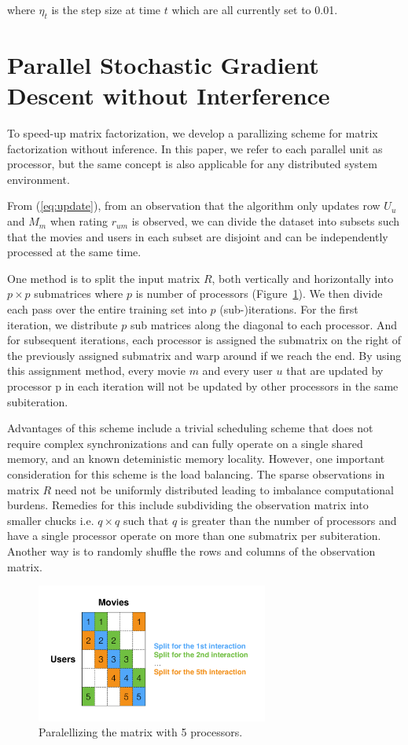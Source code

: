 \documentclass{article} %
\newcommand{\U}{U}
\begin{document}
where $\eta_t$ is the step size at time $t$ which are all currently set to 0.01.

\section{Parallel Stochastic Gradient Descent without Interference}

To speed-up matrix factorization, we develop a parallizing scheme for matrix factorization without inference.
In this paper, we refer to each parallel unit as processor, but the same concept is also applicable for any distributed system environment.

From (\ref{eq:update}), from an observation that the algorithm only updates row $\U_u$ and $M_m$ when rating $r_{um}$ is observed, we can divide the dataset into subsets such that the movies and users in each subset are disjoint and can be independently processed at the same time.

One method is to split the input matrix $R$, both vertically and horizontally
into $p \times p$ submatrices where $p$ is number of processors
(Figure~\ref{fig:split}). We then divide each pass over the entire training
set into $p$ (sub-)iterations. For the first iteration, we distribute $p$ sub
matrices along the diagonal to each processor.  And for subsequent iterations, each processor is assigned the submatrix on the right of the
previously assigned submatrix and warp around if we reach the end. By
using this assignment method, every movie $m$ and every user $u$ that are
updated by processor p in each iteration will not be updated by other
processors in the same subiteration.

Advantages of this scheme include a trivial scheduling scheme that does not require complex synchronizations and can fully operate on a single shared memory, and an known deteministic memory locality. However, one important consideration for this scheme is the load balancing. The sparse observations in matrix $R$ need not be uniformly distributed leading to imbalance computational burdens. Remedies for this include subdividing the observation matrix into smaller chucks i.e. $q \times q$ such that $q$ is greater than the number of processors and have a single processor operate on more than one submatrix per subiteration. Another way is to randomly shuffle the rows and columns of the observation matrix.

\begin{figure}[h]
\centering
\includegraphics[width=3in]{figures/split.pdf}
\caption{\label{fig:split} Paralellizing the matrix with 5 processors.}
\end{figure}
\end{document}
